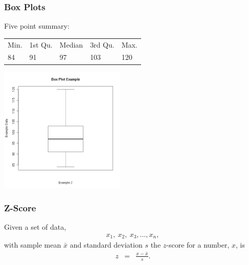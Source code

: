 \begin{frame}
  \frametitle{Box Plots}

    Five point summary: \\
    \begin{tabular}{lllll}
     Min. & 1st Qu. & Median    & 3rd Qu. &   Max. \\
     84   & 91      & 97        & 103     & 120
    \end{tabular}

    \begin{center}
      \includegraphics[width=6cm]{img/boxplotExample1}
    \end{center}

\end{frame}



\begin{frame}
  \frametitle{Z-Score}

  \begin{definition}
    Given a set of data,
    \begin{eqnarray*}
      x_1,~x_2,~x_3,\ldots,x_n,
    \end{eqnarray*}
    with sample mean $\bar{x}$ and standard deviation $s$ the
    $z$-score for a number, $x$, is
    \begin{eqnarray*}
      z & = & \frac{x-\bar{x}}{s}.
    \end{eqnarray*}
  \end{definition}

\end{frame}



